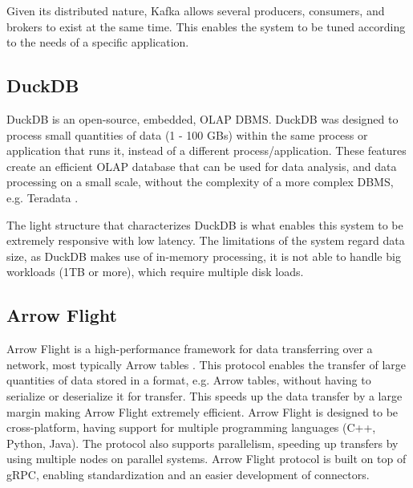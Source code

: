 Given its distributed nature, Kafka allows several producers, consumers, and brokers to exist at the same time. This enables the system to be tuned according to the needs of a specific application. 

\subsection{DuckDB}

DuckDB \cite{raasveldtDuckDBEmbeddableAnalytical2019} is an open-source, embedded, \gls{OLAP} \gls{DBMS}. DuckDB was designed to process small quantities of data (1 - 100 GBs) within the same process or application that runs it, instead of a different process/application. These features create an efficient \gls{OLAP} database that can be used for data analysis, and data processing on a small scale, without the complexity of a more complex \gls{DBMS}, e.g. Teradata \cite{shahImproveYourOLAP}. 

The light structure that characterizes DuckDB is what enables this system to be extremely responsive with low latency. The limitations of the system regard data size, as DuckDB makes use of in-memory processing, it is not able to handle big workloads (1TB or more), which require multiple disk loads.

\subsection{Arrow Flight}

Arrow Flight is a high-performance framework for data transferring over a network, most typically Arrow tables \cite{wesmIntroducingApacheArrow2019}. This protocol enables the transfer of large quantities of data stored in a format, e.g. Arrow tables, without having to serialize or deserialize it for transfer. This speeds up the data transfer by a large margin making Arrow Flight extremely efficient. Arrow Flight is designed to be cross-platform, having support for multiple programming languages (C++, Python, Java). The protocol also supports parallelism, speeding up transfers by using multiple nodes on parallel systems. Arrow Flight protocol is built on top of gRPC, enabling standardization and an easier development of connectors. 
